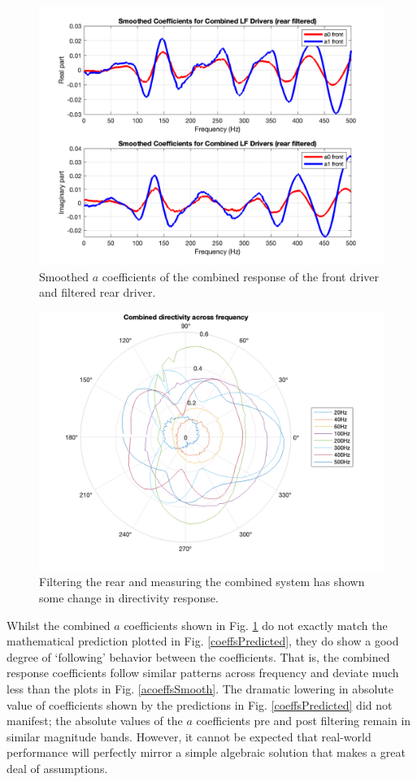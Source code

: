 \documentclass{report}
\begin{document}
    \begin{figure}[H]
        \centering
        \includegraphics[width = 0.75 \linewidth]{figs/filteredaCoeffsSmoothed.png}
        \caption{Smoothed $a$ coefficients of the combined response of the front driver and filtered rear driver.}
        \label{filteredaCoeffsSmoothed}
    \end{figure}

    \begin{figure}[H]
        \centering
        \includegraphics[width=0.8\linewidth]{figs/filteredCombinedDirectivity.png}
        \caption{Filtering the rear and measuring the combined system has shown some change in directivity response.}
        \label{filteredCombinedDirectivity}
    \end{figure}


    Whilst the combined $a$ coefficients shown in Fig. \ref{filteredaCoeffsSmoothed} do not exactly match the mathematical prediction plotted in Fig. \ref{coeffsPredicted}, they do show a good degree of `following' behavior between the coefficients.
    That is, the combined response coefficients follow similar patterns across frequency and deviate much less than the plots in Fig. \ref{acoeffsSmooth}.
    The dramatic lowering in absolute value of coefficients shown by the predictions in Fig. \ref{coeffsPredicted} did not manifest; the absolute values of the $a$ coefficients pre and post filtering remain in similar magnitude bands.
    However, it cannot be expected that real-world performance will perfectly mirror a simple algebraic solution that makes a great deal of assumptions.
\end{document}
